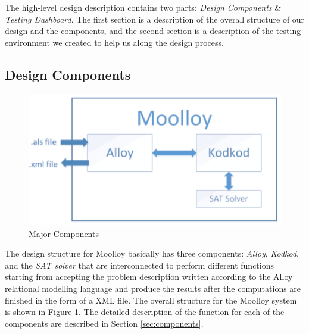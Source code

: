 \documentclass[11pt]{article}
\theoremstyle{definition}
\begin{document}
The high-level design description contains two parts: \emph{Design Components} \& \emph{Testing Dashboard}. The first section is a description of the overall structure of our design and the components, and the second section is a description of the testing environment we created to help us along the design process.

\subsection{Design Components}

\begin{figure}
\caption{Major Components} \label{fig:components}
 \includegraphics[width=\textwidth]{images/components}
\end{figure}

The design structure for Moolloy basically has three components: \emph{Alloy}, \emph{Kodkod}, and the \emph{SAT solver} that are interconnected to perform different functions starting from accepting the problem description written according to the Alloy relational modelling language and produce the results after the computations are finished in the form of a XML file. The overall structure for the Moolloy system is shown in Figure \ref{fig:components}. The detailed description of the function for each of the components are described in Section \ref{sec:components}.
\end{document}
